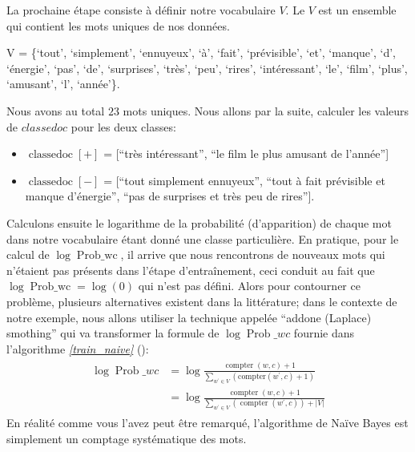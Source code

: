 \documentclass[letterpaper,11pt,english]{sphinxmanual}
\begin{document}
\sphinxAtStartPar
La prochaine étape consiste à définir notre vocabulaire \(V\). Le
\(V\) est un ensemble qui contient les mots uniques de nos données.

\sphinxAtStartPar
V = \{‘tout’, ‘simplement’, ‘ennuyeux’, ‘à’, ‘fait’, ‘prévisible’, ‘et’,
‘manque’, ‘d’, ‘énergie’, ‘pas’, ‘de’, ‘surprises’, ‘très’, ‘peu’,
‘rires’, ‘intéressant’, ‘le’, ‘film’, ‘plus’, ‘amusant’, ‘l’, ‘année’\}.

\sphinxAtStartPar
Nous avons au total \(23\) mots uniques. Nous allons par la suite,
calculer les valeurs de \(classedoc\) pour les deux classes:
\begin{itemize}
\item {} 
\sphinxAtStartPar
\(\operatorname{classedoc}[+]\) = {[}“très intéressant”, “le film
le plus amusant de l’année”{]}

\item {} 
\sphinxAtStartPar
\(\operatorname{classedoc}[-]\) = {[}“tout simplement ennuyeux”,
“tout à fait prévisible et manque d’énergie”, “pas de surprises et
très peu de rires”{]}.

\end{itemize}

\sphinxAtStartPar
Calculons ensuite le logarithme de la probabilité (d’apparition) de
chaque mot dans notre vocabulaire étant donné une classe particulière.
En pratique, pour le calcul de \(\log \operatorname{Prob\_wc}\), il
arrive que nous rencontrons de nouveaux mots qui n’étaient pas présents
dans l’étape d’entraînement, ceci conduit au fait que
\(\log \operatorname{Prob\_wc} = \log(0)\) qui n’est pas défini.
Alors pour contourner ce problème, plusieurs alternatives existent dans
la littérature; dans le contexte de notre exemple, nous allons utiliser
la technique appelée “add\sphinxhyphen{}one (Laplace) smothing” qui va transformer la
formule de \(\log \operatorname{Prob}\_wc\) fournie dans
l’algorithme {\hyperref[\detokenize{chapter3:train_naive}]{\emph{{[}train\_naive{]}}}} ():
\begin{equation}\label{equation:chapter3:chapter3:54}
\begin{split}\begin{aligned}
\displaystyle \log \operatorname{Prob}\_wc &= \log \frac{\operatorname{compter}(w, c)+1}{\sum_{w^{\prime} \in V} \left(\text {compter}\left(w^{\prime}, c\right)+1\right)}\\
&=\log \frac{\operatorname{compter}(w, c)+1}{\sum_{w^{\prime} \in V} \left(\operatorname {compter}\left(w^{\prime}, c\right)\right)+|V|}\end{aligned}\end{split}
\end{equation}
\sphinxAtStartPar
En réalité comme vous l’avez peut être remarqué, l’algorithme de Naïve
Bayes est simplement un comptage systématique des mots.
\end{document}
